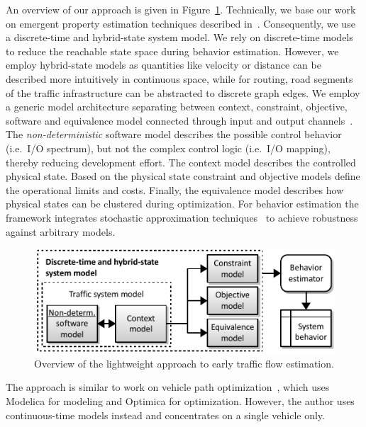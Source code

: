 \documentclass[conference]{../cls/IEEEtran}
\begin{document}

An overview of our approach is given in Figure~\ref{fig:framework}. Technically,
we base our work on emergent property estimation techniques described
in~\cite{Hackenberg2012}. Consequently, we use a discrete-time and hybrid-state
system model. We rely on discrete-time models to reduce the reachable state
space during behavior estimation. However, we employ hybrid-state models as
quantities like velocity or distance can be described more intuitively in
continuous space, while for routing, road segments of the traffic infrastructure
can be abstracted to discrete graph edges. We employ a generic model
architecture separating between context, constraint, objective, software and
equivalence model connected through input and output
channels~\cite{Hackenberg2014}.
The \textit{non-deterministic} software model describes the possible control
behavior (i.e.\ I/O spectrum), but not the complex control logic (i.e.\ I/O
mapping), thereby reducing development effort. The context model describes the
controlled physical state. Based on the physical state constraint and objective
models define the operational limits and costs.
Finally, the equivalence model describes how physical states can be clustered
during optimization. For behavior estimation the framework integrates stochastic
approximation techniques~\cite{Pereira1991} to achieve robustness against
arbitrary models.

\begin{figure}[h]
	\centering
	\includegraphics{../gfx/framework.pdf}
	\caption{Overview of the lightweight approach to early traffic flow estimation.}
	\label{fig:framework}
\end{figure}

The approach is similar to work on vehicle path
optimization~\cite{Danielsson2007}, which uses Modelica for modeling and
Optimica for optimization. However, the author uses continuous-time models
instead and concentrates on a single vehicle only.
\end{document}
